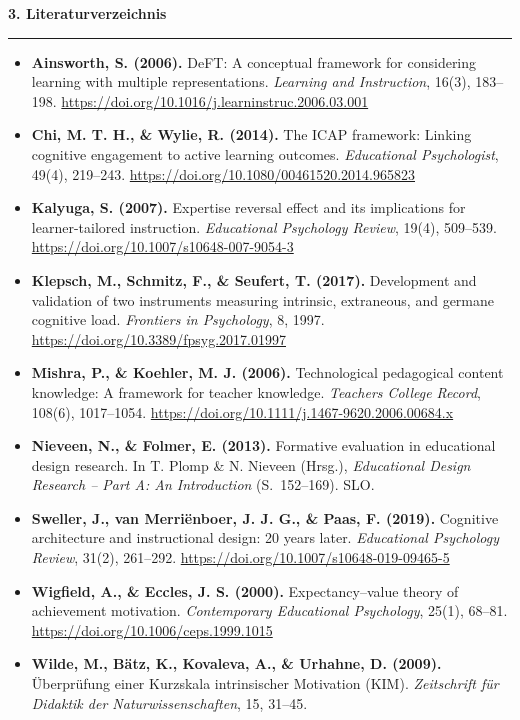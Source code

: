 \documentclass[a4paper,10pt]{article}
\newcommand{\sectionheader}[1]{%
  \vspace{6pt}
  {\large \bfseries \color{primary} #1}\\[-4pt]
  {\color{accent}\rule{\linewidth}{1.5pt}}\vspace{2pt}
}
\begin{document}
\sectionheader{3. Literaturverzeichnis}

\begin{itemize}[leftmargin=1.5em, itemsep=3pt, label={}]
  \item \textbf{Ainsworth, S. (2006).} DeFT: A conceptual framework for considering learning with multiple representations. \textit{Learning and Instruction}, 16(3), 183–198. \url{https://doi.org/10.1016/j.learninstruc.2006.03.001}
  \item \textbf{Chi, M. T. H., \& Wylie, R. (2014).} The ICAP framework: Linking cognitive engagement to active learning outcomes. \textit{Educational Psychologist}, 49(4), 219–243. \url{https://doi.org/10.1080/00461520.2014.965823}
  \item \textbf{Kalyuga, S. (2007).} Expertise reversal effect and its implications for learner-tailored instruction. \textit{Educational Psychology Review}, 19(4), 509–539. \url{https://doi.org/10.1007/s10648-007-9054-3}
  \item \textbf{Klepsch, M., Schmitz, F., \& Seufert, T. (2017).} Development and validation of two instruments measuring intrinsic, extraneous, and germane cognitive load. \textit{Frontiers in Psychology}, 8, 1997. \url{https://doi.org/10.3389/fpsyg.2017.01997}
  \item \textbf{Mishra, P., \& Koehler, M. J. (2006).} Technological pedagogical content knowledge: A framework for teacher knowledge. \textit{Teachers College Record}, 108(6), 1017–1054. \url{https://doi.org/10.1111/j.1467-9620.2006.00684.x}
  \item \textbf{Nieveen, N., \& Folmer, E. (2013).} Formative evaluation in educational design research. In T. Plomp \& N. Nieveen (Hrsg.), \textit{Educational Design Research – Part A: An Introduction} (S.~152–169). SLO.
  \item \textbf{Sweller, J., van Merriënboer, J. J. G., \& Paas, F. (2019).} Cognitive architecture and instructional design: 20 years later. \textit{Educational Psychology Review}, 31(2), 261–292. \url{https://doi.org/10.1007/s10648-019-09465-5}
  \item \textbf{Wigfield, A., \& Eccles, J. S. (2000).} Expectancy–value theory of achievement motivation. \textit{Contemporary Educational Psychology}, 25(1), 68–81. \url{https://doi.org/10.1006/ceps.1999.1015}
  \item \textbf{Wilde, M., Bätz, K., Kovaleva, A., \& Urhahne, D. (2009).} Überprüfung einer Kurzskala intrinsischer Motivation (KIM). \textit{Zeitschrift für Didaktik der Naturwissenschaften}, 15, 31–45.
\end{itemize}
\end{document}
